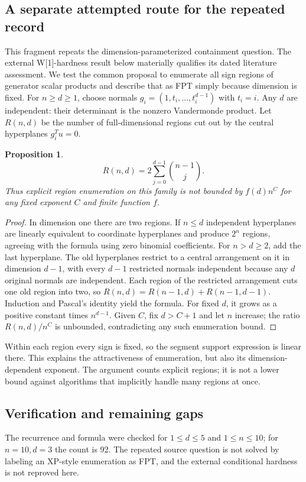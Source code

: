 \documentclass[11pt]{article}
\newtheorem{proposition}{Proposition}
\begin{document}
\subsection{A separate attempted route for the repeated record}
This fragment repeats the dimension-parameterized containment question. The external W[1]-hardness result below materially qualifies its dated literature assessment. We test the common proposal to enumerate all sign regions of generator scalar products and describe that as FPT simply because dimension is fixed.
For $n\ge d\ge1$, choose normals $g_i=(1,t_i,\ldots,t_i^{d-1})$ with $t_i=i$. Any $d$ are independent: their determinant is the nonzero Vandermonde product. Let $R(n,d)$ be the number of full-dimensional regions cut out by the central hyperplanes $g_i^Tu=0$.
\begin{proposition}
\[
 R(n,d)=2\sum_{j=0}^{d-1}\binom{n-1}{j}.
\]
Thus explicit region enumeration on this family is not bounded by $f(d)n^C$ for any fixed exponent $C$ and finite function $f$.
\end{proposition}
\begin{proof}
In dimension one there are two regions. If $n\le d$ independent hyperplanes are linearly equivalent to coordinate hyperplanes and produce $2^n$ regions, agreeing with the formula using zero binomial coefficients. For $n>d\ge2$, add the last hyperplane. The old hyperplanes restrict to a central arrangement on it in dimension $d-1$, with every $d-1$ restricted normals independent because any $d$ original normals are independent. Each region of the restricted arrangement cuts one old region into two, so
$R(n,d)=R(n-1,d)+R(n-1,d-1)$.
Induction and Pascal's identity yield the formula. For fixed $d$, it grows as a positive constant times $n^{d-1}$. Given $C$, fix $d>C+1$ and let $n$ increase; the ratio $R(n,d)/n^C$ is unbounded, contradicting any such enumeration bound.
\end{proof}
Within each region every sign is fixed, so the segment support expression is linear there. This explains the attractiveness of enumeration, but also its dimension-dependent exponent. The argument counts explicit regions; it is not a lower bound against algorithms that implicitly handle many regions at once.
\subsection{Verification and remaining gaps}
The recurrence and formula were checked for $1\le d\le5$ and $1\le n\le10$; for $n=10,d=3$ the count is 92. The repeated source question is not solved by labeling an XP-style enumeration as FPT, and the external conditional hardness is not reproved here.
\end{document}
